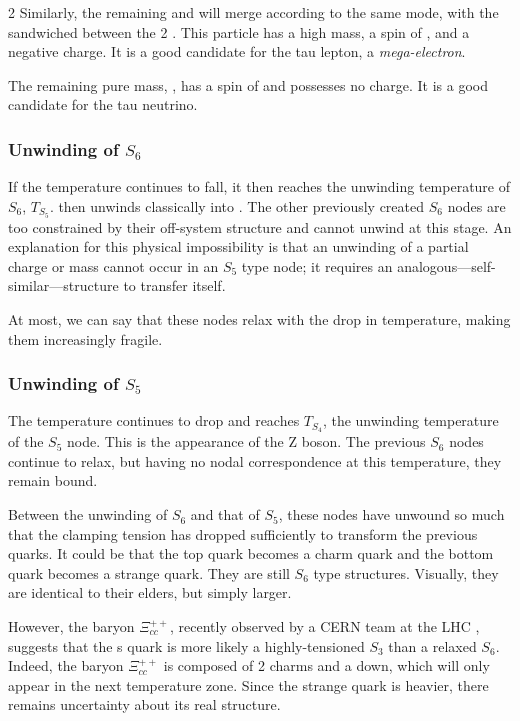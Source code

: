 \begin{multicols}{2}
	Similarly, the remaining  and  will merge according to the same mode, with the  sandwiched between the 2 . This particle has a high mass, a spin of , and a negative charge. It is a good candidate for the tau lepton, a \textit{mega-electron}.
	
	The remaining pure mass, , has a spin of  and possesses no charge. It is a good candidate for the tau neutrino.
	
	\subsubsection{Unwinding of $S_6$}
	
	If the temperature continues to fall, it then reaches the unwinding temperature of $S_6$, $T_{S_5}$.  then unwinds classically into . The other previously created $S_6$ nodes are too constrained by their off-system structure and cannot unwind at this stage. An explanation for this physical impossibility is that an unwinding of a partial charge or mass cannot occur in an $S_5$ type node; it requires an analogous—self-similar—structure to transfer itself.
	
	At most, we can say that these nodes relax with the drop in temperature, making them increasingly fragile.
	
	\subsubsection{Unwinding of $S_5$}
	
	The temperature continues to drop and reaches $T_{S_4}$, the unwinding temperature of the $S_5$ node. This is the appearance of the Z boson. The previous $S_6$ nodes continue to relax, but having no nodal correspondence at this temperature, they remain bound.
	
	Between the unwinding of $S_6$ and that of $S_5$, these nodes have unwound so much that the clamping tension has dropped sufficiently to transform the previous quarks. It could be that the top quark becomes a charm quark and the bottom quark becomes a strange quark. They are still $S_6$ type structures. Visually, they are identical to their elders, but simply larger.
	
	However, the baryon $\Xi_{cc}^{++}$, recently observed by a CERN team at the LHC \cite{cern-lhcb-charmed2022}, suggests that the s quark is more likely a highly-tensioned $S_3$ than a relaxed $S_6$. Indeed, the baryon $\Xi_{cc}^{++}$ is composed of 2 charms and a down, which will only appear in the next temperature zone. Since the strange quark is heavier, there remains uncertainty about its real structure.
	

\end{multicols}

